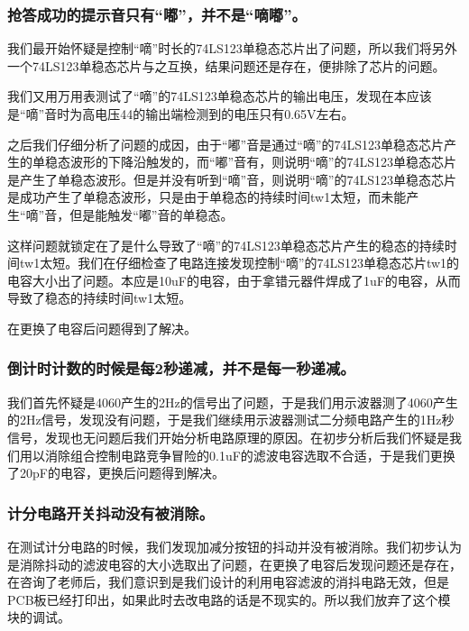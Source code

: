\documentclass{../source/Experiment}
\begin{document}
            \subsubsection{抢答成功的提示音只有“嘟”，并不是“嘀嘟”。}
            我们最开始怀疑是控制“嘀”时长的74LS123单稳态芯片出了问题，所以我们将另外一个74LS123单稳态芯片与之互换，结果问题还是存在，便排除了芯片的问题。

            我们又用万用表测试了“嘀”的74LS123单稳态芯片的输出电压，发现在本应该是“嘀”音时为高电压44的输出端检测到的电压只有0.65V左右。

            之后我们仔细分析了问题的成因，由于“嘟”音是通过“嘀”的74LS123单稳态芯片产生的单稳态波形的下降沿触发的，而“嘟”音有，则说明“嘀”的74LS123单稳态芯片是产生了单稳态波形。但是并没有听到“嘀”音，则说明“嘀”的74LS123单稳态芯片是成功产生了单稳态波形，只是由于单稳态的持续时间tw1太短，而未能产生“嘀”音，但是能触发“嘟”音的单稳态。

            这样问题就锁定在了是什么导致了“嘀”的74LS123单稳态芯片产生的稳态的持续时间tw1太短。我们在仔细检查了电路连接发现控制“嘀”的74LS123单稳态芯片tw1的电容大小出了问题。本应是10uF的电容，由于拿错元器件焊成了1uF的电容，从而导致了稳态的持续时间tw1太短。

            在更换了电容后问题得到了解决。
            \subsubsection{倒计时计数的时候是每2秒递减，并不是每一秒递减。}
            我们首先怀疑是4060产生的2Hz的信号出了问题，于是我们用示波器测了4060产生的2Hz信号，发现没有问题，于是我们继续用示波器测试二分频电路产生的1Hz秒信号，发现也无问题后我们开始分析电路原理的原因。在初步分析后我们怀疑是我们用以消除组合控制电路竞争冒险的0.1uF的滤波电容选取不合适，于是我们更换了20pF的电容，更换后问题得到解决。
            
            \subsubsection{计分电路开关抖动没有被消除。}
            在测试计分电路的时候，我们发现加减分按钮的抖动并没有被消除。我们初步认为是消除抖动的滤波电容的大小选取出了问题，在更换了电容后发现问题还是存在，在咨询了老师后，我们意识到是我们设计的利用电容滤波的消抖电路无效，但是PCB板已经打印出，如果此时去改电路的话是不现实的。所以我们放弃了这个模块的调试。
\end{document}
